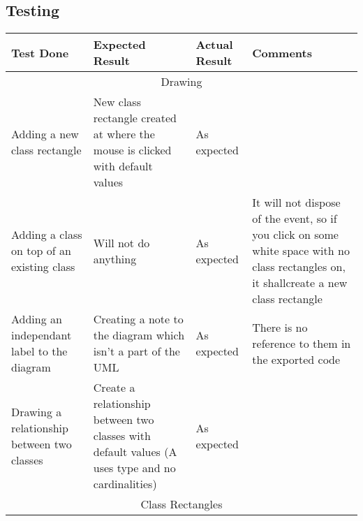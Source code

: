 
\begin{landscape}
\section{Testing}
\begin{tabular}{| p{3cm} | p{7cm} | p{7cm} | p{8cm} | }
	\hline
	Test Done & Expected Result & Actual Result & Comments \\ \hline
	\multicolumn{4}{|c|}{Drawing} \\ \hline

	Adding a new class rectangle & New class rectangle created at where the mouse is clicked with default values& As expected & \\ \hline


	Adding a class on top of an existing class & Will not do anything & As expected & It will not dispose of the event, so if you click on some white space with no class rectangles on, it shallcreate a new class rectangle\\ \hline
		
	Adding an independant label to the diagram & Creating a note to the diagram which isn't a part of the UML
	& As expected & There is no reference to them in the exported code \\ \hline

	Drawing a relationship between two classes & Create a relationship between two classes with default values (A uses type and no cardinalities)& As expected & \\ \hline

	\multicolumn{4}{|c|}{Class Rectangles}
	


\end{tabular}

 \end{landscape}
\newpage
